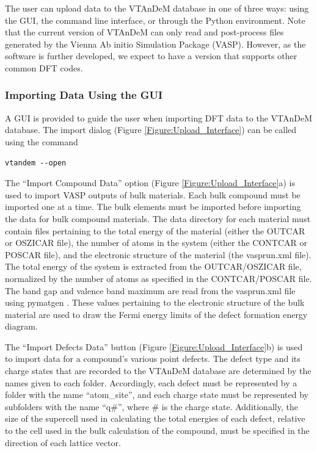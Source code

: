 \documentclass[%
 reprint,
 amsmath,amssymb,
 aps,
]{revtex4-1}
\begin{document}
The user can upload data to the VTAnDeM database in one of three ways: using the GUI, the command line interface, or through the Python environment. Note that the current version of VTAnDeM can only read and post-process files generated by the Vienna Ab initio Simulation Package (VASP). However, as the software is further developed, we expect to have a version that supports other common DFT codes.


\subsubsection{Importing Data Using the GUI} \label{Subsubsection:Importing_Data_GUI}

A GUI is provided to guide the user when importing DFT data to the VTAnDeM database. The import dialog (Figure \ref{Figure:Upload_Interface}) can be called using the command 
\begin{verbatim}
vtandem --open
\end{verbatim}

The ``Import Compound Data'' option (Figure \ref{Figure:Upload_Interface}a) is used to import VASP outputs of bulk materials. Each bulk compound must be imported one at a time. The bulk elements must be imported before importing the data for bulk compound materials. The data directory for each material must contain files pertaining to the total energy of the material (either the OUTCAR or OSZICAR file), the number of atoms in the system (either the CONTCAR or POSCAR file), and the electronic structure of the material (the vasprun.xml file). The total energy of the system is extracted from the OUTCAR/OSZICAR file, normalized by the number of atoms as specified in the CONTCAR/POSCAR file. The band gap and valence band maximum are read from the vasprun.xml file using pymatgen \cite{2013_Ong}. These values pertaining to the electronic structure of the bulk material are used to draw the Fermi energy limits of the defect formation energy diagram. 

The ``Import Defects Data'' button (Figure \ref{Figure:Upload_Interface}b) is used to import data for a compound's various point defects. The defect type and its charge states that are recorded to the VTAnDeM database are determined by the names given to each folder. Accordingly, each defect must be represented by a folder with the name ``atom\_site'', and each charge state must be represented by subfolders with the name ``q\#'', where \# is the charge state. Additionally, the size of the supercell used in calculating the total energies of each defect, relative to the cell used in the bulk calculation of the compound, must be specified in the direction of each lattice vector.
\end{document}

